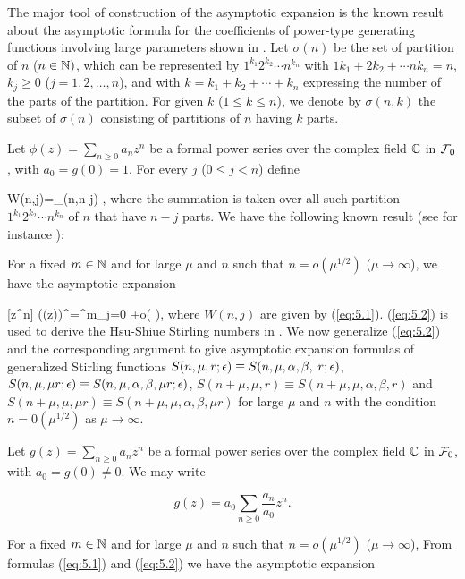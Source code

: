The major tool of construction of the asymptotic expansion is the known result about the asymptotic formula for the coefficients of power-type generating functions involving large parameters shown in \cite{Hsu90}. Let $\sigma(n)$ be the set of partition of $n$ ($n\in{{\mathbb N}})$, which can be represented by $1^{k_1}2^{k_2}\cdots n^{k_n}$ with $1k_1+2k_2+\cdots nk_n=n$, $k_j\geq 0$ ($j=1,2,\ldots, n$), and with $k=k_1+k_2+\cdots +k_n$ expressing the number of the parts of the partition. For given $k$ ($1\leq k\leq n$), we denote by $\sigma(n,k)$ the subset of $\sigma(n)$ consisting of partitions of $n$ having $k$ parts.

Let $\phi(z)=\sum_{n\geq 0} a_n z^n$ be a formal power series over the complex field ${{\mathbb C}}$ in ${\cal F}_0$, with $a_0=g(0)=1$. For every $j$ ($0\leq j< n$) define

\be\label{eq:5.1}
W(n,j)=\sum_{\sigma (n,n-j)} ,
\ee
where the summation is taken over all such partition $1^{k_1} 2^{k_2}\cdots n^{k_n}$ of $n$ that have $n-j$ parts.
We have the following known result (see for instance \cite{Hor85}):

For a fixed $m\in {{\mathbb N}}$ and for large $\mu$ and $n$ such that $n=o(\mu^{1/2})$ ($\mu \to \infty$), we have the asymptotic expansion

\be\label{eq:5.2}
 [z^n] (\phi(z))^\mu =\sum^m_{j=0} +o\left( \right),
\ee
where $W(n,j)$ are given by (\ref{eq:5.1}). (\ref{eq:5.2}) is used to derive the Hsu-Shiue Stirling numbers in \cite{HS98}. We now generalize (\ref{eq:5.2}) and the corresponding argument to give asymptotic expansion formulas of generalized Stirling functions $S(n,\mu, r;{\epsilon})\equiv S(n, \mu, \alpha, \beta,$ $r; {\epsilon})$, $S(n,\mu, \mu r;{\epsilon})\equiv S(n, \mu, \alpha, \beta,\mu r; {\epsilon})$, $S(n+\mu, \mu, r)\equiv S(n+\mu, \mu, \alpha,\beta, r)$ and $S(n+\mu, \mu, \mu r)\equiv S(n+\mu, \mu, \alpha,\beta, \mu r)$ for large $\mu$ and $n$ with the condition $n=0(\mu^{1/2})$ as $\mu\to \infty$.

Let $g(z)=\sum_{n\geq 0} a_n z^n$ be a formal power series over the complex field ${{\mathbb C}}$ in ${\cal F}_0$, with $a_0=g(0)\not= 0$. We may write

\[
g(z)=a_0 \sum_{n\geq 0} \frac{a_n}{a_0} z^n.
\]

For a fixed $m\in {{\mathbb N}}$ and for large $\mu$ and $n$ such that $n=o(\mu^{1/2})$ ($\mu \to \infty$), From  formulas (\ref{eq:5.1}) and (\ref{eq:5.2}) we have the asymptotic expansion

